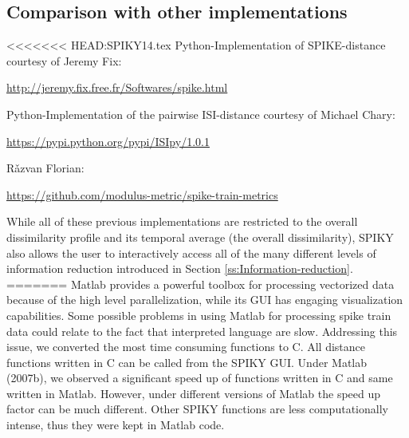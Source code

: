 \documentclass[10pt,twocolumn]{elsart5p}
\begin{document}
%


\subsection{\label{ss:Comparison} Comparison with other implementations}

<<<<<<< HEAD:SPIKY14.tex
Python-Implementation of SPIKE-distance courtesy of Jeremy Fix:

\url{http://jeremy.fix.free.fr/Softwares/spike.html}

Python-Implementation of the pairwise ISI-distance courtesy of Michael Chary:

\url{https://pypi.python.org/pypi/ISIpy/1.0.1}

R{\v a}zvan Florian:

\url{https://github.com/modulus-metric/spike-train-metrics}

\citep{Rusu14}

While all of these previous implementations are restricted to the overall dissimilarity profile and its temporal average (the overall dissimilarity), SPIKY also allows the user to interactively access all of the many different levels of information reduction introduced in Section \ref{ss:Information-reduction}.
=======
Matlab provides a powerful toolbox for processing vectorized data because of the high level parallelization, while its GUI has engaging visualization capabilities. Some possible problems in using Matlab for processing spike train data could relate to the fact that interpreted language are slow. Addressing this issue, we converted the most time consuming functions to C. All distance functions written in C can be called from the SPIKY GUI. Under Matlab (2007b), we observed a significant speed up of functions written in C and same written in Matlab. However, under different versions of Matlab the speed up factor can be much different. Other SPIKY functions are less computationally intense, thus they were kept in Matlab code.
\end{document}
